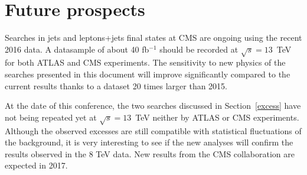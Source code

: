\documentclass[epj]{webofc}
\begin{document}
\section{Future prospects}
\label{future}

Searches in jets and leptons+jets final states at CMS are ongoing
using the recent 2016 data.  A datasample of about  40 fb$^{-1}$ should be recorded at $\sqrt{s}=13$~TeV
for both ATLAS and CMS experiments. The sensitivity to new physics of 
the searches presented in this document will improve significantly
compared to the current results thanks to a dataset 20 times larger
than 2015.

At the date of this conference, the two searches 
discussed in Section~\ref{excess} have not being repeated yet at
$\sqrt{s}=13$~TeV neither by ATLAS or CMS experiments.
Although the observed excesses are still compatible with statistical
fluctuations of the background, it is very interesting to see if the
new analyses will confirm the results observed in the 8 TeV data. 
New results from the CMS collaboration are expected in 2017.



%
% 
%
%

\hspace{0.5cm}
\end{document}
